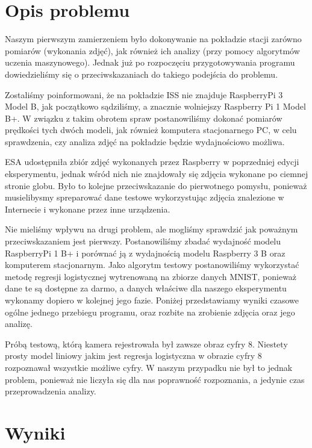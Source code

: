 \section{Opis problemu}\label{sec:performance_introduction}

Naszym pierwszym zamierzeniem było dokonywanie na pokładzie stacji zarówno pomiarów
(wykonania zdjęć), jak również ich analizy (przy pomocy algorytmów uczenia maszynowego). Jednak już po
rozpoczęciu przygotowywania programu dowiedzieliśmy się o przeciwskazaniach do takiego
podejścia do problemu.

Zostaliśmy poinformowani, że na pokładzie ISS nie znajduje RaspberryPi 3
Model B, jak początkowo sądziliśmy, a znacznie wolniejszy Raspberry Pi 1 Model B+. W związku
z takim obrotem spraw postanowiliśmy dokonać pomiarów prędkości tych dwóch modeli, jak
również komputera stacjonarnego PC, w celu sprawdzenia, czy analiza zdjęć na pokładzie będzie
wydajnościowo możliwa.

ESA udostępniła zbiór zdjęć wykonanych przez Raspberry w poprzedniej edycji eksperymentu, jednak
wśród nich nie znajdowały się zdjęcia wykonane po ciemnej stronie globu. Było to kolejne przeciwskazanie
do pierwotnego pomysłu, ponieważ musielibysmy spreparować dane testowe wykorzystując zdjęcia znalezione
w Internecie i wykonane przez inne urządzenia.

Nie mieliśmy wpływu na drugi problem, ale mogliśmy sprawdzić jak poważnym przeciwskazaniem jest pierwszy.
Postanowiliśmy zbadać wydajność modelu RaspberryPi 1 B+ i porównać ją z wydajnością modelu Raspberry 3 B oraz
komputerem stacjonarnym. Jako algorytm testowy postanowiliśmy wykorzystać metodę regresji logistycznej
wytrenowaną na zbiorze danych MNIST, ponieważ dane te są dostępne za darmo, a danych właściwe dla naszego
eksperymentu wykonamy dopiero w kolejnej jego fazie. Poniżej przedstawiamy wyniki czasowe ogólne jednego
przebiegu programu, oraz rozbite na zrobienie zdjęcia oraz jego analizę.

Próbą testową, którą kamera rejestrowała był zawsze obraz cyfry 8. Niestety prosty model liniowy jakim jest
regresja logistyczna w obrazie cyfry 8 rozpoznawał wszystkie możliwe cyfry. W naszym przypadku nie był to
jednak problem, ponieważ nie liczyła się dla nas poprawność rozpoznania, a jedynie czas przeprowadzenia analizy.

\section{Wyniki}\label{sec:performance_results}

